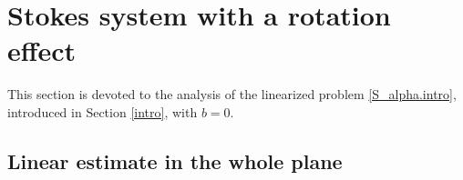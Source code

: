 \documentclass[11pt,a4paper]{article}
\begin{document}
\section{Stokes system with a rotation effect}\label{sec.linear}



This section is devoted to the analysis of the linearized problem \eqref{S_alpha.intro}, introduced in Section \ref{intro}, with $b=0$.



\subsection{Linear estimate in the whole plane}\label{subsec.linear.whole}
\end{document}
